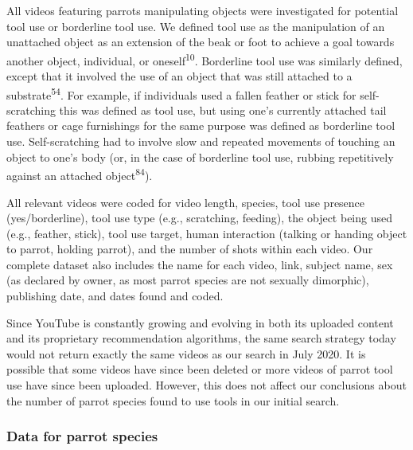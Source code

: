 \documentclass[
  man, donotrepeattitle,floatsintext]{apa6}
\begin{document}
All videos featuring parrots manipulating objects were investigated for
potential tool use or borderline tool use. We defined tool use as the
manipulation of an unattached object as an extension of the beak or foot to
achieve a goal towards another object, individual, or oneself\textsuperscript{10}.
Borderline tool use was similarly defined, except that it involved the use of an
object that was still attached to a substrate\textsuperscript{54}. For example, if
individuals used a fallen feather or stick for self-scratching this was defined
as tool use, but using one's currently attached tail feathers or cage
furnishings for the same purpose was defined as borderline tool use.
Self-scratching had to involve slow and repeated movements of touching an object
to one's body (or, in the case of borderline tool use, rubbing repetitively
against an attached object\textsuperscript{84}).

All relevant videos were coded for video length, species, tool use presence
(yes/borderline), tool use type (e.g., scratching, feeding), the object being
used (e.g., feather, stick), tool use target, human interaction
(talking or handing object to parrot, holding parrot), and the number of shots
within each video. Our complete dataset also includes the name for each video,
link, subject name, sex (as declared by owner, as most parrot species are not
sexually dimorphic), publishing date, and dates found and coded.

Since YouTube is constantly growing and evolving in both its uploaded content
and its proprietary recommendation algorithms, the same search strategy today
would not return exactly the same videos as our search in July 2020. It is
possible that some videos have since been deleted or more videos of parrot tool
use have since been uploaded. However, this does not affect our conclusions
about the number of parrot species found to use tools in our initial search.

\hypertarget{data-for-parrot-species}{%
\subsubsection{Data for parrot species}\label{data-for-parrot-species}}
\end{document}
